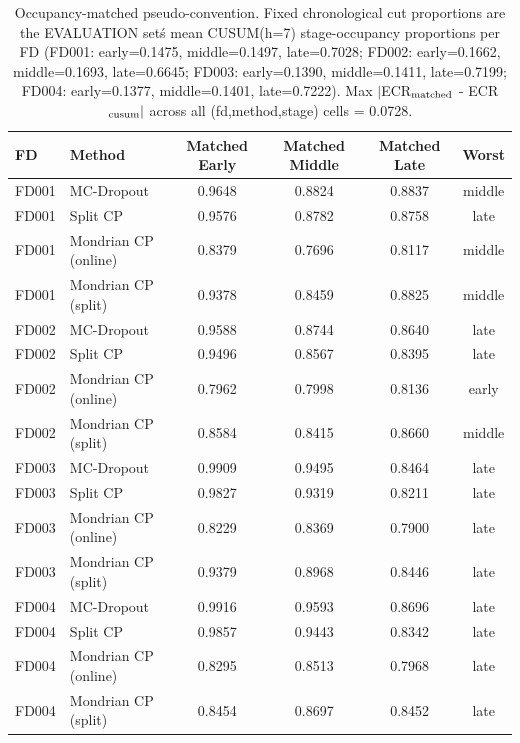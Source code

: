 \begin{table}[t]
\caption{Occupancy-matched pseudo-convention. Fixed chronological cut proportions are the EVALUATION set\'s mean CUSUM(h=7) stage-occupancy proportions per FD (FD001: early=0.1475, middle=0.1497, late=0.7028; FD002: early=0.1662, middle=0.1693, late=0.6645; FD003: early=0.1390, middle=0.1411, late=0.7199; FD004: early=0.1377, middle=0.1401, late=0.7222). Max $|$ECR$_{\rm matched}$ - ECR$_{\rm cusum}|$ across all (fd,method,stage) cells = 0.0728.}
\label{tab:matched-v3}
\centering
\small
\begin{tabular}{llcccc}
\toprule
FD & Method & Matched Early & Matched Middle & Matched Late & Worst \\
\midrule
FD001 & MC-Dropout & 0.9648 & 0.8824 & 0.8837 & middle \\
FD001 & Split CP & 0.9576 & 0.8782 & 0.8758 & late \\
FD001 & Mondrian CP (online) & 0.8379 & 0.7696 & 0.8117 & middle \\
FD001 & Mondrian CP (split) & 0.9378 & 0.8459 & 0.8825 & middle \\
FD002 & MC-Dropout & 0.9588 & 0.8744 & 0.8640 & late \\
FD002 & Split CP & 0.9496 & 0.8567 & 0.8395 & late \\
FD002 & Mondrian CP (online) & 0.7962 & 0.7998 & 0.8136 & early \\
FD002 & Mondrian CP (split) & 0.8584 & 0.8415 & 0.8660 & middle \\
FD003 & MC-Dropout & 0.9909 & 0.9495 & 0.8464 & late \\
FD003 & Split CP & 0.9827 & 0.9319 & 0.8211 & late \\
FD003 & Mondrian CP (online) & 0.8229 & 0.8369 & 0.7900 & late \\
FD003 & Mondrian CP (split) & 0.9379 & 0.8968 & 0.8446 & late \\
FD004 & MC-Dropout & 0.9916 & 0.9593 & 0.8696 & late \\
FD004 & Split CP & 0.9857 & 0.9443 & 0.8342 & late \\
FD004 & Mondrian CP (online) & 0.8295 & 0.8513 & 0.7968 & late \\
FD004 & Mondrian CP (split) & 0.8454 & 0.8697 & 0.8452 & late \\
\bottomrule
\end{tabular}
\end{table}

